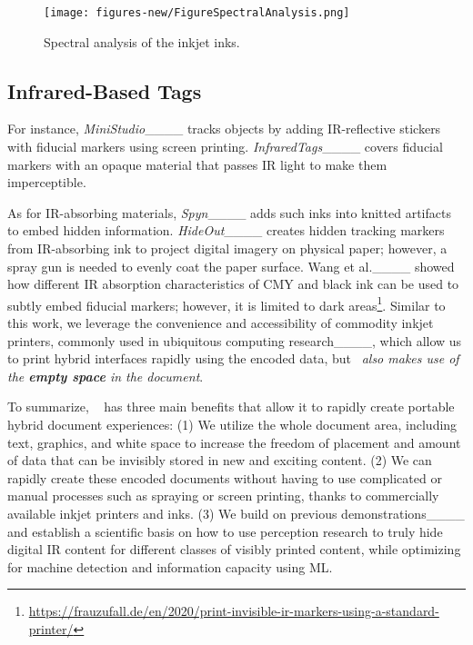 \begin{figure*}[]
  \centering
  \texttt{[image: figures-new/FigureSpectralAnalysis.png]}
  \caption{Spectral analysis of the inkjet inks.}
  \label{fig:inkSpectrumFigure}
\end{figure*}






\subsection{Infrared-Based Tags}
For instance, 
\textit{MiniStudio}____ tracks objects by adding IR-reflective stickers
with fiducial markers
using screen printing.
\textit{InfraredTags}____ covers fiducial markers with an opaque material that passes IR light to make them imperceptible.

As for IR-absorbing materials, 
\textit{Spyn}____ adds such inks into knitted artifacts to embed hidden information.
\textit{HideOut}____ creates hidden tracking markers from IR-absorbing ink to project digital imagery on physical paper; however, a spray gun is needed to evenly coat the paper surface.
Wang et al.____ showed how different IR absorption characteristics of CMY and black ink can be used to subtly embed fiducial markers; however, it is limited to dark areas\footnote{\url{https://frauzufall.de/en/2020/print-invisible-ir-markers-using-a-standard-printer/}}.
Similar to this work, we leverage the convenience and accessibility of commodity inkjet printers, commonly used in ubiquitous computing research____, which allow us to print hybrid interfaces rapidly using the encoded data, but \systemName~\textit{also makes use of the \textbf{empty space} in the document}.



\vspace{0.2cm}
To summarize, %
\systemName~ has three main benefits that allow it to rapidly create portable %
hybrid document experiences:
(1) We utilize the whole document area, including text, graphics, and white space to increase the freedom of placement and amount of data that can be invisibly stored in new and exciting content. %
(2) We can rapidly create these encoded documents without having to use complicated or manual processes such as spraying or screen printing, thanks to commercially available inkjet printers and inks.
(3) We build on previous demonstrations____ and establish a scientific basis on how to use perception research to truly hide digital IR content for different classes of visibly printed content, while optimizing for machine detection and information capacity using ML.